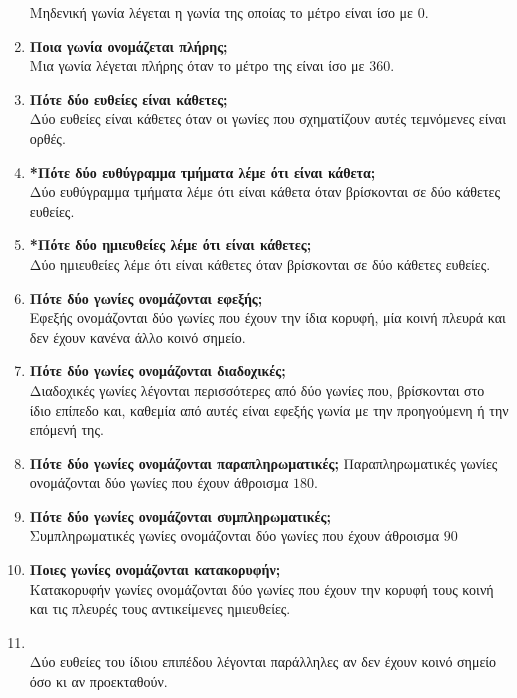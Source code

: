 \documentclass[a4paper,11pt]{report}
\begin{document}
\begin{enumerate}
      Μηδενική γωνία λέγεται η γωνία της οποίας το μέτρο είναι ίσο με $0$\textdegree.
\item \textbf{Ποια γωνία ονομάζεται πλήρης;}\\
      Μια γωνία λέγεται πλήρης όταν το μέτρο της είναι ίσο με $360$\textdegree.
\item \textbf{Πότε δύο ευθείες είναι κάθετες;}\\
      Δύο ευθείες είναι κάθετες όταν οι γωνίες που σχηματίζουν αυτές τεμνόμενες είναι ορθές.
\item \textbf{*Πότε δύο ευθύγραμμα τμήματα λέμε ότι είναι κάθετα;}\\
      Δύο ευθύγραμμα τμήματα λέμε ότι είναι κάθετα όταν βρίσκονται σε δύο κάθετες ευθείες.
\item \textbf{*Πότε δύο ημιευθείες λέμε ότι είναι κάθετες;}\\
      Δύο ημιευθείες λέμε ότι είναι κάθετες όταν βρίσκονται σε δύο κάθετες ευθείες.
\item \textbf{Πότε δύο γωνίες ονομάζονται εφεξής;}\\
       Εφεξής ονομάζονται δύο γωνίες που έχουν την ίδια κορυφή, μία κοινή πλευρά και δεν έχουν κανένα 
       άλλο κοινό σημείο.
\item \textbf{Πότε δύο γωνίες ονομάζονται διαδοχικές;}\\
      Διαδοχικές γωνίες λέγονται περισσότερες από δύο γωνίες που, βρίσκονται στο ίδιο επίπεδο και, καθεμία από 
      αυτές είναι εφεξής γωνία με την προηγούμενη ή την επόμενή της.
\item \textbf{Πότε δύο γωνίες ονομάζονται παραπληρωματικές;}
      Παραπληρωματικές γωνίες ονομάζονται δύο γωνίες που έχουν άθροισμα $180$\textdegree.
\item \textbf{Πότε δύο γωνίες ονομάζονται συμπληρωματικές;}\\
      Συμπληρωματικές γωνίες ονομάζονται δύο γωνίες που έχουν άθροισμα $90$\textdegree
\item \textbf{Ποιες γωνίες ονομάζονται κατακορυφήν;}\\
      Κατακορυφήν γωνίες ονομάζονται δύο γωνίες που έχουν την κορυφή τους κοινή και τις πλευρές τους 
      αντικείμενες ημιευθείες.
\item {}\\
       Δύο ευθείες του ίδιου επιπέδου λέγονται παράλληλες αν δεν έχουν κοινό σημείο όσο κι αν προεκταθούν.

\end{enumerate}
\end{document}

